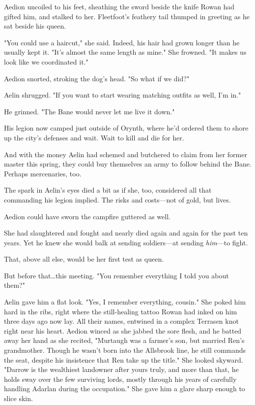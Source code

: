 Aedion uncoiled to his feet, sheathing the sword beside the knife Rowan had gifted him, and stalked to her.
Fleetfoot's feathery tail thumped in greeting as he sat beside his queen.

"You could use a haircut," she said.
Indeed, his hair had grown longer than he usually kept it.
"It's almost the same length as mine."
She frowned.
"It makes us look like we coordinated it."

Aedion snorted, stroking the dog's head.
"So what if we did?"

Aelin shrugged.
"If you want to start wearing matching outfits as well, I'm in."

He grinned.
"The Bane would never let me live it down."

His legion now camped just outside of Orynth, where he'd ordered them to shore up the city's defenses and wait.
Wait to kill and die for her.

And with the money Aelin had schemed and butchered to claim from her former master this spring, they could buy themselves an army to follow behind the Bane.
Perhaps mercenaries, too.

The spark in Aelin's eyes died a bit as if she, too, considered all that commanding his legion implied.
The risks and costs---not of gold, but lives.

Aedion could have sworn the campfire guttered as well.

She had slaughtered and fought and nearly died again and again for the past ten years.
Yet he knew she would balk at sending soldiers---at sending \emph{him}---to fight.

That, above all else, would be her first test as queen.

But before that\ldots this meeting.
"You remember everything I told you about them?"

Aelin gave him a flat look.
"Yes, I remember everything, cousin."
She poked him hard in the ribs, right where the still-healing tattoo Rowan had inked on him three days ago now lay.
All their names, entwined in a complex Terrasen knot right near his heart.
Aedion winced as she jabbed the sore flesh, and he batted away her hand as she recited, "Murtaugh was a farmer's son, but married Ren's grandmother.
Though he wasn't born into the Allsbrook line, he still commands the seat, despite his insistence that Ren take up the title."
She looked skyward.
"Darrow is the wealthiest landowner after yours truly, and more than that, he holds sway over the few surviving lords, mostly through his years of carefully handling Adarlan during the occupation."
She gave him a glare sharp enough to slice skin.

